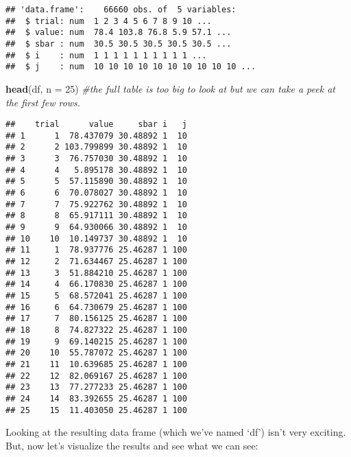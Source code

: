 \documentclass[]{article}
\newenvironment{Shaded}{\begin{snugshade}}{\end{snugshade}}
\newcommand{\KeywordTok}[1]{\textcolor[rgb]{0.13,0.29,0.53}{\textbf{{#1}}}}
\newcommand{\DataTypeTok}[1]{\textcolor[rgb]{0.13,0.29,0.53}{{#1}}}
\newcommand{\DecValTok}[1]{\textcolor[rgb]{0.00,0.00,0.81}{{#1}}}
\newcommand{\CommentTok}[1]{\textcolor[rgb]{0.56,0.35,0.01}{\textit{{#1}}}}
\newcommand{\NormalTok}[1]{{#1}}
\begin{document}
\begin{verbatim}
## 'data.frame':    66660 obs. of  5 variables:
##  $ trial: num  1 2 3 4 5 6 7 8 9 10 ...
##  $ value: num  78.4 103.8 76.8 5.9 57.1 ...
##  $ sbar : num  30.5 30.5 30.5 30.5 30.5 ...
##  $ i    : num  1 1 1 1 1 1 1 1 1 1 ...
##  $ j    : num  10 10 10 10 10 10 10 10 10 10 ...
\end{verbatim}

\begin{Shaded}
\begin{Highlighting}[]
\KeywordTok{head}\NormalTok{(df, }\DataTypeTok{n =} \DecValTok{25}\NormalTok{) }\CommentTok{#the full table is too big to look at but we can take a peek at the first few rows.}
\end{Highlighting}
\end{Shaded}

\begin{verbatim}
##    trial      value     sbar i   j
## 1      1  78.437079 30.48892 1  10
## 2      2 103.799899 30.48892 1  10
## 3      3  76.757030 30.48892 1  10
## 4      4   5.895178 30.48892 1  10
## 5      5  57.115890 30.48892 1  10
## 6      6  70.078027 30.48892 1  10
## 7      7  75.922762 30.48892 1  10
## 8      8  65.917111 30.48892 1  10
## 9      9  64.930066 30.48892 1  10
## 10    10  10.149737 30.48892 1  10
## 11     1  78.937776 25.46287 1 100
## 12     2  71.634467 25.46287 1 100
## 13     3  51.884210 25.46287 1 100
## 14     4  66.170830 25.46287 1 100
## 15     5  68.572041 25.46287 1 100
## 16     6  64.730679 25.46287 1 100
## 17     7  80.156125 25.46287 1 100
## 18     8  74.827322 25.46287 1 100
## 19     9  69.140215 25.46287 1 100
## 20    10  55.787072 25.46287 1 100
## 21    11  10.639685 25.46287 1 100
## 22    12  82.069167 25.46287 1 100
## 23    13  77.277233 25.46287 1 100
## 24    14  83.392655 25.46287 1 100
## 25    15  11.403050 25.46287 1 100
\end{verbatim}

Looking at the resulting data frame (which we've named `df') isn't very
exciting. But, now let's visualize the results and see what we can see:
\end{document}

